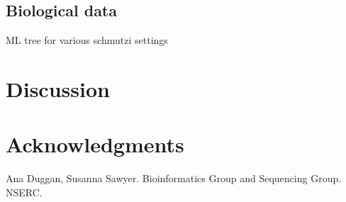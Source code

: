 \documentclass[a4paper,12pt]{article}
\begin{document}

\subsection{Biological data}

ML tree for various schmutzi settings

\section{Discussion}

\section{Acknowledgments}

Ana Duggan, Susanna Sawyer. Bioinformatics Group and Sequencing Group. NSERC.

{}

\end{document}
